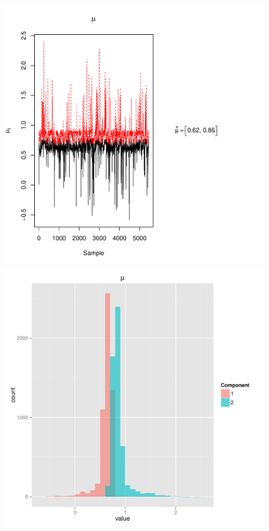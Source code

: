 \documentclass{article}
\begin{document}
\clearpage

\begin{figure}
	\begin{minipage}[h!]{0.49\textwidth}
		\centering
		\includegraphics[width=1.15\textwidth]{muTrace2.pdf}
	\end{minipage}
	\begin{minipage}[h!]{0.49\textwidth}
		\centering
		\includegraphics[width=1\textwidth]{muHist2.pdf}	
	\end{minipage}
\end{figure}
\end{document}
